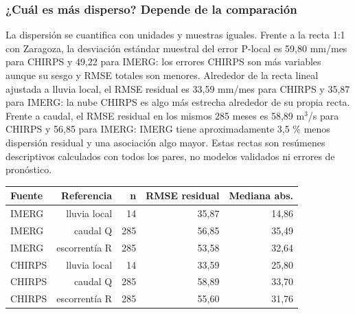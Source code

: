 \documentclass[10pt,a4paper]{article}
\begin{document}
\subsubsection*{¿Cuál es más disperso? Depende de la comparación}
La dispersión se cuantifica con unidades y muestras iguales. Frente a la recta 1:1 con Zaragoza, la desviación estándar muestral del error P-local es 59,80 mm/mes para CHIRPS y 49,22 para IMERG: los errores CHIRPS son más variables aunque su sesgo y RMSE totales son menores. Alrededor de la recta lineal ajustada a lluvia local, el RMSE residual es 33,59 mm/mes para CHIRPS y 35,87 para IMERG: la nube CHIRPS es algo más estrecha alrededor de su propia recta. Frente a caudal, el RMSE residual en los mismos 285 meses es 58,89 m$^3$/s para CHIRPS y 56,85 para IMERG: IMERG tiene aproximadamente 3,5 \% menos dispersión residual y una asociación algo mayor. Estas rectas son resúmenes descriptivos calculados con todos los pares, no modelos validados ni errores de pronóstico.
\begin{center}\small\begin{tabular}{lrrrr}\hline
Fuente & Referencia & n & RMSE residual & Mediana abs. \\ \hline
IMERG & lluvia local & 14 & 35,87 & 14,86 \\
IMERG & caudal Q & 285 & 56,85 & 35,49 \\
IMERG & escorrentía R & 285 & 53,58 & 32,64 \\
CHIRPS & lluvia local & 14 & 33,59 & 25,80 \\
CHIRPS & caudal Q & 285 & 58,89 & 33,70 \\
CHIRPS & escorrentía R & 285 & 55,60 & 31,76 \\
\hline\end{tabular}\end{center}
\end{document}
